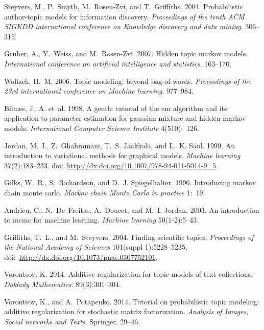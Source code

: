 \documentclass[12pt, twoside]{article}
\begin{document}
\begin{thebibliography}{10}
Steyvers, M., P.~Smyth, M.~Rosen-Zvi,  and T.~Griffiths.
2004.
Probabilistic author-topic models for information discovery.
\emph{Proceedings of the tenth ACM SIGKDD international conference on Knowledge
  discovery and data mining}.
306--315.

Gruber, A., Y.~Weiss,  and M.~Rosen-Zvi.
2007.
Hidden topic markov models.
\emph{International conference on artificial intelligence and statistics}.
163--170.

Wallach, H.~M.
2006.
Topic modeling: beyond bag-of-words.
\emph{Proceedings of the 23rd international conference on Machine learning}.
977--984.

Bilmes, J.~A. et~al.
1998.
A gentle tutorial of the em algorithm and its application to parameter
  estimation for gaussian mixture and hidden markov models.
\emph{International Computer Science Institute}
4(510):~126.

Jordan, M.~I., Z.~Ghahramani, T.~S. Jaakkola,  and L.~K. Saul.
1999.
An introduction to variational methods for graphical models.
\emph{Machine learning}
37(2):183--233.
doi:~\url{http://dx.doi.org/10.1007/978-94-011-5014-9_5}.

Gilks, W.~R., S.~Richardson,  and D.~J. Spiegelhalter.
1996.
Introducing markov chain monte carlo.
\emph{Markov chain Monte Carlo in practice}
1:~19.

Andrieu, C., N.~De~Freitas, A.~Doucet,  and M.~I. Jordan.
2003.
An introduction to mcmc for machine learning.
\emph{Machine learning}
50(1-2):5--43.

Griffiths, T.~L.,  and M.~Steyvers.
2004.
Finding scientific topics.
\emph{Proceedings of the National Academy of Sciences}
101(suppl 1):5228--5235.
doi:~\url{http://dx.doi.org/10.1073/pnas.0307752101}.

Vorontsov, K.
2014.
Additive regularization for topic models of text collections.
\emph{Doklady Mathematics}.
89(3):301--304.

Vorontsov, K.,  and A.~Potapenko.
2014.
Tutorial on probabilistic topic modeling: additive regularization for
  stochastic matrix factorization.
\emph{Analysis of Images, Social networks and Texts}.
Springer.
29--46.


\end{thebibliography}
\end{document}
